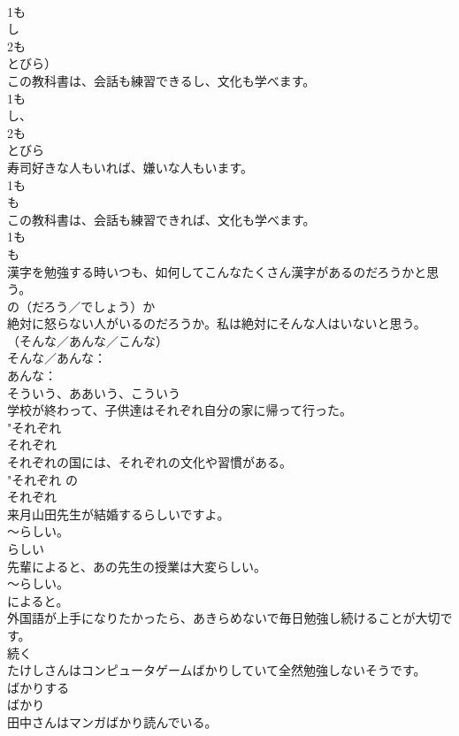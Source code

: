 \documentclass[8pt]{extreport}
\begin{document}
\begin{CJK}{UTF8}{min}
{\\	1も　
\\	し　
\\	2も
\\	とびら）
\\	この教科書は、会話も練習できるし、文化も学べます。	
\\	1も 
\\	し、
\\	2も 
\\	とびら
\\	寿司好きな人もいれば、嫌いな人もいます。	
\\	1も 
\\	も　
\\	この教科書は、会話も練習できれば、文化も学べます。	
\\	1も 
\\	も　
\\	漢字を勉強する時いつも、如何してこんなたくさん漢字があるのだろうかと思う。	
\\	の（だろう／でしょう）か 
\\	絶対に怒らない人がいるのだろうか。私は絶対にそんな人はいないと思う。	
\\	（そんな／あんな／こんな）
\\	そんな／あんな： 
\\	あんな： 
\\	そういう、ああいう、こういう 
\\	学校が終わって、子供達はそれぞれ自分の家に帰って行った。	
\\	"それぞれ 
\\	それぞれ 
\\	それぞれの国には、それぞれの文化や習慣がある。	
\\	"それぞれ の
\\	それぞれ 
\\	来月山田先生が結婚するらしいですよ。	
\\	〜らしい。 
\\	らしい 
\\	先輩によると、あの先生の授業は大変らしい。	
\\	〜らしい。 
\\	によると。 
\\	外国語が上手になりたかったら、あきらめないで毎日勉強し続けることが大切です。	
\\	続く 
\\	たけしさんはコンピュータゲームばかりしていて全然勉強しないそうです。	
\\	ばかりする 
\\	ばかり 
\\	田中さんはマンガばかり読んでいる。 
}
\end{CJK}
\end{document}
